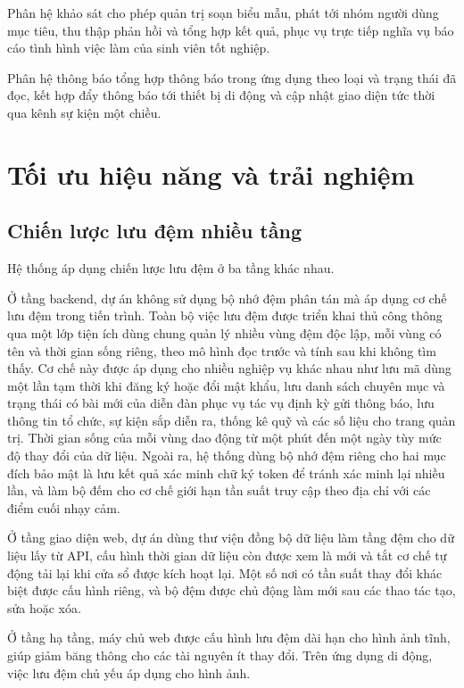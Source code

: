 \documentclass[12pt,a4paper,oneside]{report}
\begin{document}
Phân hệ khảo sát cho phép quản trị soạn biểu mẫu, phát tới nhóm người dùng mục tiêu, thu thập phản hồi và tổng hợp kết quả, phục vụ trực tiếp nghĩa vụ báo cáo tình hình việc làm của sinh viên tốt nghiệp.

Phân hệ thông báo tổng hợp thông báo trong ứng dụng theo loại và trạng thái đã đọc, kết hợp đẩy thông báo tới thiết bị di động và cập nhật giao diện tức thời qua kênh sự kiện một chiều.

\section{Tối ưu hiệu năng và trải nghiệm}

\subsection{Chiến lược lưu đệm nhiều tầng}

Hệ thống áp dụng chiến lược lưu đệm ở ba tầng khác nhau.

Ở tầng backend, dự án không sử dụng bộ nhớ đệm phân tán mà áp dụng cơ chế lưu đệm trong tiến trình. Toàn bộ việc lưu đệm được triển khai thủ công thông qua một lớp tiện ích dùng chung quản lý nhiều vùng đệm độc lập, mỗi vùng có tên và thời gian sống riêng, theo mô hình đọc trước và tính sau khi không tìm thấy. Cơ chế này được áp dụng cho nhiều nghiệp vụ khác nhau như lưu mã dùng một lần tạm thời khi đăng ký hoặc đổi mật khẩu, lưu danh sách chuyên mục và trạng thái có bài mới của diễn đàn phục vụ tác vụ định kỳ gửi thông báo, lưu thông tin tổ chức, sự kiện sắp diễn ra, thống kê quỹ và các số liệu cho trang quản trị. Thời gian sống của mỗi vùng dao động từ một phút đến một ngày tùy mức độ thay đổi của dữ liệu. Ngoài ra, hệ thống dùng bộ nhớ đệm riêng cho hai mục đích bảo mật là lưu kết quả xác minh chữ ký token để tránh xác minh lại nhiều lần, và làm bộ đếm cho cơ chế giới hạn tần suất truy cập theo địa chỉ với các điểm cuối nhạy cảm.

Ở tầng giao diện web, dự án dùng thư viện đồng bộ dữ liệu làm tầng đệm cho dữ liệu lấy từ API, cấu hình thời gian dữ liệu còn được xem là mới và tắt cơ chế tự động tải lại khi cửa sổ được kích hoạt lại. Một số nơi có tần suất thay đổi khác biệt được cấu hình riêng, và bộ đệm được chủ động làm mới sau các thao tác tạo, sửa hoặc xóa.

Ở tầng hạ tầng, máy chủ web được cấu hình lưu đệm dài hạn cho hình ảnh tĩnh, giúp giảm băng thông cho các tài nguyên ít thay đổi. Trên ứng dụng di động, việc lưu đệm chủ yếu áp dụng cho hình ảnh.
\end{document}
